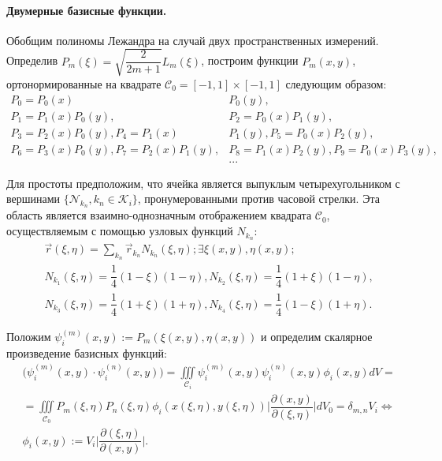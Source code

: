 \documentclass[14pt, a4paper, fleqn]{extreport}
\begin{document}
  	\paragraph{Двумерные базисные функции.}
	Обобщим полиномы Лежандра на случай двух пространственных измерений.
	Определив $P_m(\xi) = \sqrt{\dfrac{2}{2m+1}} L_m(\xi)$, построим функции $P_m(x,y)$, 
	ортонормированные на квадрате $\mathcal{C}_0 = [-1, 1] \times [-1, 1]$ следующим образом:
	\begin{equation*}
	\begin{split}
		P_0 = P_0(x)&P_0(y), \\
		P_1 = P_1(x)P_0(y), & P_2 = P_0(x)P_1(y), \\
		P_3 = P_2(x)P_0(y), P_4 = P_1(x)&P_1(y), P_5 = P_0(x)P_2(y), \\
		P_6 = P_3(x)P_0(y), P_7 = P_2(x)P_1(y), &P_8 = P_1(x)P_2(y), P_9 = P_0(x)P_3(y), \\
		&...
	\end{split}
	\end{equation*}
	
	Для простоты предположим, что ячейка является выпуклым четырехугольником
	с вершинами $\Big\lbrace \mathcal{N}_{k_n}, k_n \in \mathcal{K}_i \Big\rbrace$, 
	пронумерованными против часовой стрелки.
	Эта область является взаимно-однозначным отображением квадрата $\mathcal{C}_0$, 
	осуществляемым с помощью узловых функций $N_{k_n}$:
	\begin{equation*}
	\begin{split}
		&\vec{r}(\xi,\eta) = \sum\limits_{k_n} \vec{r}_{k_n} N_{k_n}(\xi, \eta); \exists \xi(x,y), \eta(x,y);
		\\
		&N_{k_1}(\xi,\eta) = \dfrac{1}{4}(1 - \xi)(1 - \eta), N_{k_2}(\xi, \eta) = \dfrac{1}{4}(1 + \xi)(1 - \eta), \\
		&N_{k_3}(\xi,\eta) = \dfrac{1}{4}(1 + \xi)(1 + \eta), N_{k_4}(\xi, \eta) = \dfrac{1}{4}(1 - \xi)(1 + \eta).
	\end{split}
	\end{equation*}
	
	Положим $\psi_i^{(m)}(x,y) := P_m(\xi(x,y),\eta(x,y))$ и
	определим скалярное произведение базисных функций:
	\begin{equation*}
	\begin{split}
		&\Big( \psi_i^{(m)}(x,y) \cdot \psi_i^{(n)}(x,y) \Big)
			= \iiint\limits_{\mathcal{C}_i} \psi_i^{(m)}(x,y) \psi_i^{(n)}(x,y) \phi_i(x,y) dV = \\
		&   = \iiint\limits_{\mathcal{C}_0} P_m(\xi,\eta) P_n(\xi,\eta) \phi_i(x(\xi,\eta),y(\xi,\eta)) 
				\Big|\dfrac{\partial(x,y)}{\partial(\xi,\eta)}\Big| dV_0
		    = \delta_{m,n} V_i \Leftrightarrow \\
		&\phi_i(x,y) := V_i\Big|\dfrac{\partial(\xi,\eta)}{\partial(x,y)}\Big|.
	\end{split}
	\end{equation*}
	
\end{document}
